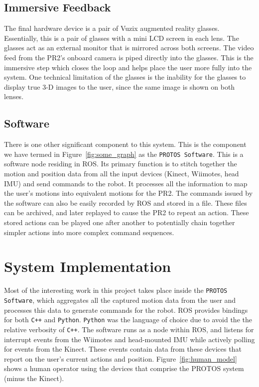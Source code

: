 \documentclass{sig-alternate}
\begin{document}
\subsection{Immersive Feedback}
\label{sec:model_feedback}
The final hardware device is a pair of Vuzix augmented reality glasses.
Essentially, this is a pair of glasses with a mini LCD screen in each lens. The glasses act as
an external monitor that is mirrored across both screens. 
The video feed from the PR2's onboard camera is piped
directly into the glasses. This is the immersive step which closes the loop and
helps place the user more fully into the system. One technical limitation of the glasses is
the inability for the glasses to display true 3-D images to the user, since the same image is
shown on both lenses.

\subsection{Software}
\label{sec:model_software}
There is one other significant component to this system. This is the
component we have
termed in Figure~\ref{fig:some_graph} as the {\tt PROTOS Software}. This is a 
software node residing in ROS. Its primary function is to stitch together the
motion and position data from all the input devices (Kinect, Wiimotes, head 
IMU) and send commands to the robot. It processes all the information to map the user's motions
into equivalent motions for the PR2. The commands issued by the software can also be easily recorded by 
ROS and stored in a file. These files can be archived, and later replayed to cause the PR2 to repeat an action.
These stored actions can be played one after another to potentially chain together simpler actions into
more complex command sequences.

\section{System Implementation}
\label{sec:system_implementation}
Most of the interesting work in this project takes place inside the
{\tt PROTOS Software}, which aggregates all the captured motion data from the
user and processes this data to generate commands for the robot. ROS provides
bindings for both {\tt C++} and {\tt Python}. {\tt Python} was the language of choice due to avoid
the the relative verbosity of {\tt C++}.
The software runs as a node within ROS, and listens for interrupt events from the Wiimotes and head-mounted
IMU while actively polling for events from the Kinect. These events contain data
from these devices that report on the user's current actions and position. Figure~\ref{fig:human_model} shows
a human operator using the devices that comprise the PROTOS system (minus the Kinect).
\end{document}
